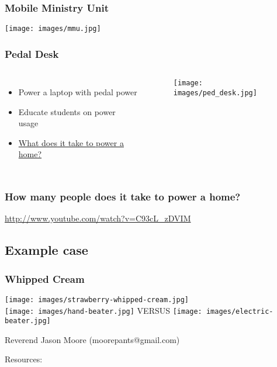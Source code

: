 \documentclass[]{beamer}
\begin{document}
\frame
{
    \frametitle{Mobile Ministry Unit}
    \begin{center}
			\texttt{[image: images/mmu.jpg]}
    \end{center}
}
\frame
{
    \frametitle{Pedal Desk}
    \begin{columns}[t]
        \column{6cm}
        \begin{itemize}
            \item Power a laptop with pedal power
            \item Educate students on power usage
            \item \href{http://news.bbc.co.uk/2/hi/science/nature/8394055.stm}{What does it take to power a home?}
        \end{itemize}
        \column{5cm}
        \begin{center}
        \begin{figure}[]
            \texttt{[image: images/ped\_desk.jpg]}
        \end{figure}
        \end{center}
    \end{columns}
}
\frame
{
    \frametitle{How many people does it take to power a home?}
    \url{http://www.youtube.com/watch?v=C93cL_zDVIM}
}
\subsection{Example case}
\frame
{
    \frametitle{Whipped Cream}
		\begin{center}
			\texttt{[image: images/strawberry-whipped-cream.jpg]}
			\\
			\texttt{[image: images/hand-beater.jpg]}
			\large{VERSUS}
			\texttt{[image: images/electric-beater.jpg]}
		\end{center}
}
\begin{frame}[shrink=30]
	\begin{center}
		\alert{Reverend Jason Moore (moorepants@gmail.com)}\\
	\end{center}
	Resources:
	\nocite{McCullagh1977}
	\nocite{Wilson1986}
	\nocite{Wilson2004}
	\nocite{Dean2008}
	\nocite{Jansen2011}

	
	\small
\end{frame}
\end{document}
